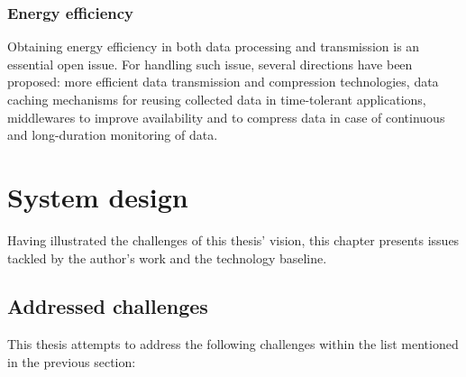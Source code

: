 \documentclass{ieeeaccess}
\begin{document}
\subsubsection{Energy efficiency}

Obtaining energy efficiency in both data processing and transmission is an essential open issue. For handling such issue, several directions have been proposed: more efficient data transmission and compression technologies, data caching mechanisms for reusing collected data in time-tolerant applications, middlewares to improve availability and to compress data in case of continuous and long-duration monitoring of data.

\section{System design}
\label{sec:technicals}

Having illustrated the challenges of this thesis' vision, this chapter presents issues tackled by the author's work and the technology baseline.

\subsection{Addressed challenges}

This thesis attempts to address the following challenges within the list mentioned in the previous section:
\end{document}
